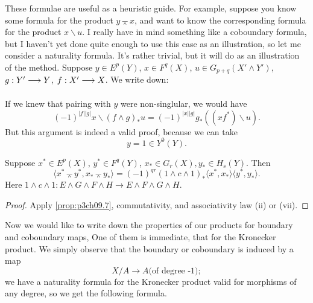 \documentclass[../main]{subfiles}
\begin{document}
These formulae are useful as a heuristic guide. For example, suppose you know some formula for the product $y \barwedge x$, and want to know the corresponding formula for the product $x \backslash u$. I really have in mind something like a coboundary formula, but I haven't yet done quite enough to use this case as an illustration, so let me consider a naturality formula. It's rather trivial, but it will do as an illustration of the method. Suppose $y \in E^p(Y)$, $x \in F^q(X)$, $u \in G_{p + q}(X' \wedge Y')$, $g : Y' \lar{} Y$, $f : X' \lar{} X$. We write down:
\begin{center}
\end{center}
If we knew that pairing with $y$ were non-singlular, we would have \[(-1)^{|f||g|}x\backslash(f\wedge g)_\ast u=(-1)^{|x||g|}g_\ast((xf^\ast)\backslash u).\] But this argument is indeed a valid proof, because we can take \[y=1 \in Y^0(Y).\]
\begin{proposition}\label{prop:p3ch09.8}
    Suppose $x^\ast \in E^p(X)$, $y^\ast \in F^q(Y)$, $x_\ast \in G_r(X), y_\ast \in H_s(Y)$. Then \[\langle x^\ast \barwedge y^\ast, x_\ast \barwedge y_\ast\rangle = (-1)^{qr}(1 \wedge c \wedge 1)_\ast \langle x^\ast,x_\ast\rangle\langle y^\ast,y_\ast\rangle .\] Here $1 \wedge c \wedge 1: E \wedge G \wedge F \wedge H \longrightarrow E \wedge F \wedge G \wedge H. $
\end{proposition}

\begin{proof}
Apply \ref{prop:p3ch09.7}, commutativity, and associativity law (ii) or (vii).
\end{proof}

Now we would like to write down the properties of our products for boundary and coboundary maps, One of them is immediate, that for the Kronecker product. We simply observe that the boundary or coboundary is induced by a map \[ X/A \longrightarrow A \text{(of degree -1)};\] we have a naturality formula for the Kronecker product valid for morphisms of any degree, so we get the following formula.
\end{document}
